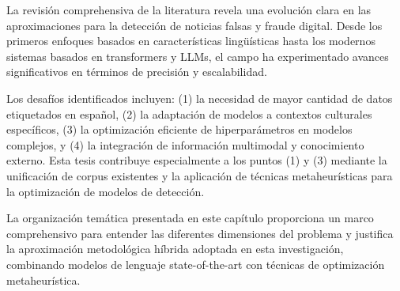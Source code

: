 La revisión comprehensiva de la literatura revela una evolución clara en las aproximaciones para la detección de noticias falsas y fraude digital. Desde los primeros enfoques basados en características lingüísticas hasta los modernos sistemas basados en transformers y LLMs, el campo ha experimentado avances significativos en términos de precisión y escalabilidad.

Los desafíos identificados incluyen: (1) la necesidad de mayor cantidad de datos etiquetados en español, (2) la adaptación de modelos a contextos culturales específicos, (3) la optimización eficiente de hiperparámetros en modelos complejos, y (4) la integración de información multimodal y conocimiento externo. Esta tesis contribuye especialmente a los puntos (1) y (3) mediante la unificación de corpus existentes y la aplicación de técnicas metaheurísticas para la optimización de modelos de detección.

La organización temática presentada en este capítulo proporciona un marco comprehensivo para entender las diferentes dimensiones del problema y justifica la aproximación metodológica híbrida adoptada en esta investigación, combinando modelos de lenguaje state-of-the-art con técnicas de optimización metaheurística.